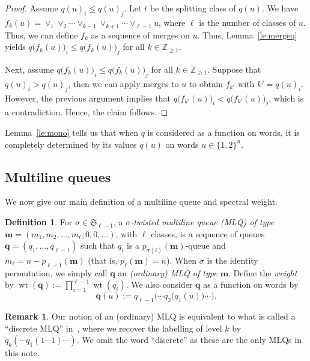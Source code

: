 \documentclass[reqno]{amsart}
\newcommand{\0}{\phantom{c}}
\newcommand{\merge}[1]{\vee_{#1}} %
\newcommand{\SymGp}[1]{\mathfrak{S}_{#1}} %
\DeclareMathOperator{\wt}{wt} %
\newcommand{\mm}{\mathbf{m}}
\newcommand{\qq}{\mathbf{q}}
\newcommand{\ZZ}{\mathbb{Z}}
\let\prodnonlimits\prod
\renewcommand{\prod}{\prodnonlimits\limits}
\newcommand{\tup}[1]{\left( #1 \right)}
\newcommand{\defn}[1]{{\color{darkred}\emph{#1}}} %
\theoremstyle{plain}
\theoremstyle{definition}
\newtheorem{dfn}[thm]{Definition}
\newtheorem{remark}[thm]{Remark}
\numberwithin{equation}{section}
\begin{document}
\begin{proof}
Assume $q(u)_i \leq q(u)_j$.
Let $t$ be the splitting class of $q(u)$.
We have $f_k \tup{u} = \merge{1} \merge{2} \cdots \merge{k-1} \merge{k+1} \cdots \merge{\ell-1} u$, where $\ell$ is the number of classes of $u$.
Thus, we can define $f_k$ as a sequence of merges on $u$.
Thus, Lemma~\ref{le:mergeq} yields $q\bigl( f_k(u) \bigr)_i \leq q\bigl( f_k(u) \bigr)_j$ for all $k \in \ZZ_{\geq 1}$.

Next, assume $q\bigl( f_k(u) \bigr)_i \leq q\bigl( f_k(u) \bigr)_j$ for all $k \in \ZZ_{\geq 1}$.
Suppose that $q(u)_i > q(u)_j$, then we can apply merges to $u$ to obtain $f_{k'}$ with $k' = q(u)_i$.
However, the previous argument implies that $q\bigl(f_{k'}(u) \bigr)_i < q\bigl(f_{k'}(u) \bigr)_j$, which is a contradiction.
Hence, the claim follows.
\end{proof}

Lemma~\ref{le:mono} tells us that when $q$ is considered as a function on words, it is completely determined by its values $q(u)$ on words $u \in \{1,2\}^n$.


\subsection{Multiline queues}

We now give our main definition of a multiline queue and spectral weight.

\begin{dfn}
For $\sigma \in \SymGp{\ell-1}$, a \defn{$\sigma$-twisted multiline queue (MLQ) of type $\mm = \tup{m_1, m_2, \ldots, m_\ell, 0, 0, \ldots}$}, with $\ell$ classes, is a sequence of queues $\qq = (q_1, \dotsc, q_{\ell-1})$ such that $q_i$ is a $p_{\sigma(i)}(\mm)$-queue and $m_{\ell} = n - p_{\ell-1}(\mm)$ (that is, $p_\ell(\mm) = n$).
When $\sigma$ is the identity permutation, we simply call $\qq$ an \defn{(ordinary) MLQ of type $\mm$}.
Define the \defn{weight} by $\wt(\qq) := \prod_{i=1}^{\ell-1} \wt(q_i)$.
We also consider $\qq$ as a function on words by
\[
\qq(u) := q_{\ell-1}\bigl( \cdots q_2\bigl( q_1(u) \bigr) \cdots \bigr).
\]
\end{dfn}

\begin{remark}
Our notion of an (ordinary) MLQ is equivalent to what is called a ``discrete MLQ'' in~\cite[\S 2.2]{AasLin17}, where we recover the labelling of level $k$ by $q_k( \cdots q_1(1 \dotsm 1) \cdots )$.
We omit the word ``discrete'' as these are the only MLQs in this note.
\end{remark}
\end{document}

